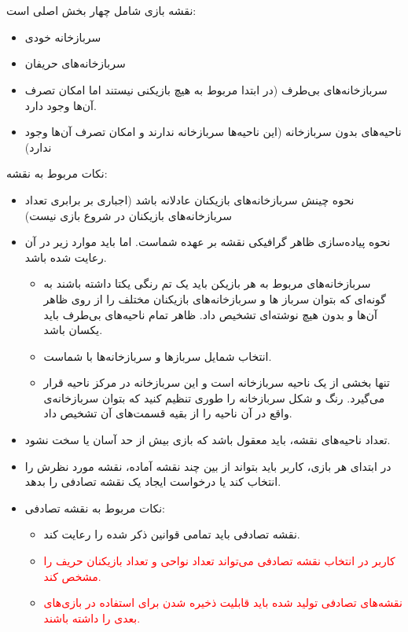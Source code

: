 \documentclass[]{article}
\begin{document}
\section*{{}}
نقشه بازی شامل چهار بخش اصلی است:
\begin{itemize}
    \item{سربازخانه خودی
}
    \item{سربازخانه‌های حریفان
}
    \item{سربازخانه‌های بی‌طرف (در ابتدا مربوط به هیچ بازیکنی نیستند اما امکان تصرف آن‌ها وجود دارد.
}
    \item{ناحیه‌های بدون سربازخانه (این ناحیه‌ها سربازخانه ندارند و امکان تصرف آن‌ها وجود ندارد)
}    
\end{itemize}
\newpage
نکات مربوط به نقشه:
\begin{itemize}
    \item{نحوه چینش سرباز‌خانه‌های بازیکنان عادلانه باشد (اجباری بر برابری تعداد سرباز‌خانه‌های بازیکنان در شروع بازی نیست)}
    \item{نحوه‌ پیاده‌سازی ظاهر گرافیکی نقشه بر عهده شماست. اما باید موارد زیر در آن رعایت شده باشد.
    \begin{itemize}
        \item{سربازخانه‌های مربوط به هر بازیکن باید یک تم رنگی یکتا داشته باشند به‌ گونه‌ای که بتوان سرباز ها و سربازخانه‌های بازیکنان مختلف را از روی ظاهر آن‌ها و بدون هیچ نوشته‌ای تشخیص داد. ظاهر تمام ناحیه‌های بی‌طرف باید یکسان باشد.
} 
        \item{انتخاب شمایل سرباز‌ها و سربازخانه‌ها با شماست.
} 
        \item{تنها بخشی از یک ناحیه سربازخانه است و این سربازخانه در مرکز ناحیه قرار می‌گیرد. رنگ و شکل سربازخانه را طوری تنظیم کنید که بتوان سربازخانه‌ی واقع در آن ناحیه را از بقیه قسمت‌های آن تشخیص داد.
} 
    \end{itemize}
}
    \item{تعداد ناحیه‌های نقشه، باید معقول باشد که بازی بیش از حد آسان یا سخت نشود.
}
    \item{در ابتدای هر بازی، کاربر باید بتواند از بین چند نقشه آماده، نقشه مورد نظرش را انتخاب کند یا درخواست ایجاد یک نقشه تصادفی را بدهد.
}
    \item{نکات مربوط به نقشه تصادفی:
    \begin{itemize}
        \item{نقشه تصادفی باید تمامی قوانین ذکر شده را رعایت کند.
}
        \item{
        \textcolor{red}{کاربر در انتخاب نقشه تصادفی می‌تواند تعداد نواحی و تعداد بازیکنان حریف را مشخص کند.
}
        }
        \item{
        \textcolor{red}{نقشه‌های تصادفی تولید شده باید قابلیت ذخیره شدن برای استفاده در بازی‌های بعدی را داشته باشند.  
}
        }
    \end{itemize}
}

\end{itemize}
\end{document}
